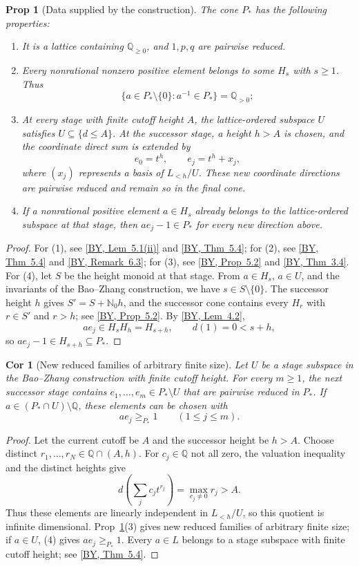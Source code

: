 \documentclass[10pt,letterpaper]{amsart}
\numberwithin{equation}{section}
\newtheorem{prop}[thm]{Prop}
\newtheorem{cor}[thm]{Cor}
\theoremstyle{definition}
\newcommand{\Q}{\mathbb Q}
\newcommand{\N}{\mathbb N}
\newcommand{\byref}[2]{\href{https://arxiv.org/pdf/2610.38300v1\#page=#1}{[BY, #2]}}
\begin{document}
\begin{prop}[Data supplied by the construction]\label{prop:construction-data}
The cone $P_*$ has the following properties:
\begin{enumerate}
\item It is a lattice containing $\Q_{\ge0}$, and $1,p,q$ are pairwise reduced.
\item Every nonrational nonzero positive element belongs to some $H_s$ with $s\ge1$. Thus
\[
\{a\in P_*\setminus\{0\}:a^{-1}\in P_*\}=\Q_{>0};
\]
\item At every stage with finite cutoff height $A$, the lattice-ordered subspace $U$ satisfies $U\subseteq\{d\le A\}$. At the successor stage, a height $h>A$ is chosen, and the coordinate direct sum is extended by
\[
e_0=t^h,\qquad e_j=t^h+x_j,
\]
where $(x_j)$ represents a basis of $L_{<h}/U$. These new coordinate directions are pairwise reduced and remain so in the final cone.
\item If a nonrational positive element $a\in H_s$ already belongs to the lattice-ordered subspace at that stage, then $ae_j-1\in P_*$ for every new direction above.
\end{enumerate}
\end{prop}
\begin{proof}
For (1), see \byref{13}{Lem~5.1(ii)} and \byref{16}{Thm~5.4}; for (2), see \byref{16}{Thm~5.4} and \byref{19}{Remark~6.3}; for (3), see \byref{14}{Prop~5.2} and \byref{8}{Thm~3.4}.
For (4), let $S$ be the height monoid at that stage. From $a\in H_s$, $a\in U$, and the invariants of the Bao--Zhang construction, we have $s\in S\setminus\{0\}$. The successor height $h$ gives $S'=S+\N_0h$, and the successor cone contains every $H_r$ with $r\in S'$ and $r>h$; see \byref{14}{Prop~5.2}. By \byref{11}{Lem~4.2},
\[
ae_j\in H_sH_h=H_{s+h},\qquad d(1)=0<s+h,
\]
so $ae_j-1\in H_{s+h}\subseteq P_*$.
\end{proof}

\begin{cor}[New reduced families of arbitrary finite size]\label{cor:new-directions}
Let $U$ be a stage subspace in the Bao--Zhang construction with finite cutoff height. For every $m\ge1$, the next successor stage contains $e_1,\ldots,e_m\in P_*\setminus U$ that are pairwise reduced in $P_*$. If $a\in(P_*\cap U)\setminus\Q$, these elements can be chosen with
\[
ae_j\ge_{P_*}1\qquad(1\le j\le m).
\]
\end{cor}
\begin{proof}
Let the current cutoff be $A$ and the successor height be $h>A$. Choose distinct $r_1,\ldots,r_N\in\Q\cap(A,h)$. For $c_j\in\Q$ not all zero, the valuation inequality and the distinct heights give
\[
d\!\left(\sum_jc_jt^{r_j}\right)=\max_{c_j\ne0}r_j>A.
\]
Thus these elements are linearly independent in $L_{<h}/U$, so this quotient is infinite dimensional. Prop~\ref{prop:construction-data}(3) gives new reduced families of arbitrary finite size; if $a\in U$, (4) gives $ae_j\ge_{P_*}1$.
Every $a\in L$ belongs to a stage subspace with finite cutoff height; see \byref{16}{Thm~5.4}.
\end{proof}
\end{document}
